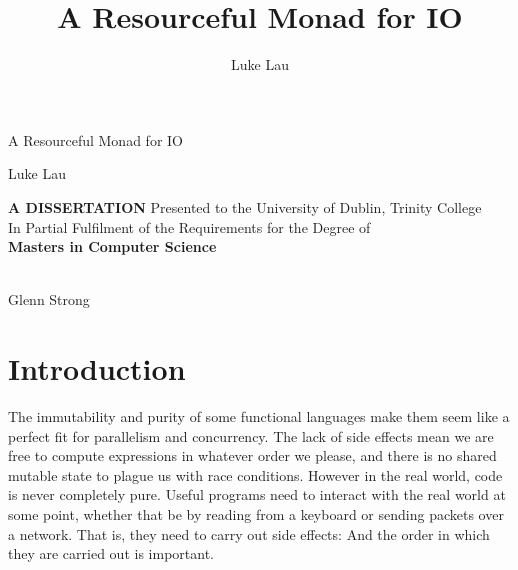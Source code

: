 \documentclass{report}
\newif\ifdeclaration
\begin{document}
\newcommand{\llbracket}{[\![}
\newcommand{\rrbracket}{]\!]}
\newcommand{\IO}{\mathsf{IO}}
\newcommand{\bind}{>\!\!>\!\!=} \newcommand{\concbind}{>\!\!>\!>\!\!=}
\newcommand{\subtyp}{\geq:}
\newcommand{\notsubtyp}{\ngeq:}
\newcommand{\lift}[1]{\ensuremath{\llbracket#1\rrbracket}}
\newcommand{\use}[2]{\ensuremath{\llbracket#2\rrbracket_{#1}}}
\newcommand{\ftv}{\operatorname{FTV}}
\newcommand{\fv}{\operatorname{FV}}
\newtheorem{theorem}{Theorem}
\newtheorem{lemma}{Lemma}

\author{Luke Lau}
\title{A Resourceful Monad for IO}
\begin{titlepage}
  \begin{center}
    {\Huge A Resourceful  Monad for IO}
    \vskip 0.25in
    \centerline{\Large Luke Lau}
    \vfill
    \large
    {
      {\uppercase{\Large \bf A Dissertation}}
      \vskip 0.2in
      Presented to the University of Dublin, Trinity College \\
      In Partial Fulfilment of the Requirements for the Degree of \\
      \vskip 0.2in
      {\bf Masters in Computer Science}
    }

    \vfill
  \end{center}

   \\
  Glenn Strong

\end{titlepage}

\ifdeclaration
\chapter*{Declaration}

I hereby declare that this project is entirely my own work and that it has not
been submitted as an exercise for a degree at this or any other university.

\begin{flushleft}
  \vskip 2cm
  Luke Lau \\
  \smallskip
  April 2020
\end{flushleft}


\pagebreak
\fi

\tableofcontents

\chapter{Introduction}
The immutability and purity of some functional languages make them seem like a
perfect fit for parallelism and concurrency. The lack of side effects mean we
are free to compute expressions in whatever order we please, and there is no
shared mutable state to plague us with race conditions. However in the
real world, code is never completely pure. Useful programs need to interact with
the real world at some point, whether that be by reading from a keyboard or
sending packets over a network. That is, they need to carry out side
effects: And the order in which they are carried out is important.
\end{document}
